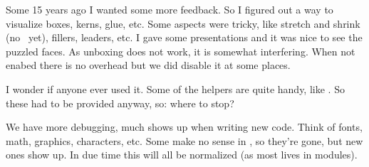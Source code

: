 
\startdocument
  [title=Visual debugging,
   color=darkmagenta]

\StartSteps

\startsubject[title=How it started]

    \startitemize[packed]

        \startitem Some 15 years ago I wanted some more feedback. \stopitem \FlushStep
        \startitem So I figured out a way to visualize boxes, kerns, glue, etc. \stopitem \FlushStep
        \startitem Some aspects were tricky, like stretch and shrink (no \ETEX\ yet), fillers, leaders, etc. \stopitem \FlushStep
        \startitem I gave some presentations and it was nice to see the puzzled faces. \stopitem \FlushStep
        \startitem As unboxing does not work, it is somewhat interfering. \stopitem \FlushStep
        \startitem When not enabed there is no overhead but we did disable it at some places. \stopitem \FlushStep

    \stopitemize

\stopsubject

\startsubject[title=Do we need it]

    \startitemize[packed]

        \startitem I wonder if anyone ever used it. \stopitem \FlushStep
        \startitem Some of the helpers are quite handy, like . \stopitem \FlushStep
        \startitem So these had to be provided anyway, so: where to stop? \stopitem \FlushStep

    \stopitemize

\stopsubject

\StopSteps \page \StartSteps

\startsubject[title=All kind of debugging]

    \startitemize[packed]

        \startitem We have more debugging, much shows up when writing new code. \stopitem \FlushStep
        \startitem Think of fonts, math, graphics, characters, etc. \stopitem \FlushStep
        \startitem Some make no sense in \MKIV, so they're gone, but new ones show up. \stopitem \FlushStep
        \startitem In due time this will all be normalized (as most lives in modules). \stopitem \FlushStep

    \stopitemize

\stopsubject

\StopSteps \page \StartSteps

\startsubject[title=Why we kept it]

